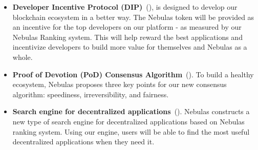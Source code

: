 {\begin{itemize}
	\item \textbf{Developer Incentive Protocol (DIP)}~(), is designed to develop our blockchain ecosystem in a better way. The Nebulas token will be provided as an incentive for the top developers on our platform - as measured by our Nebulas Ranking system. This will help reward the best applications and incentivize developers to build more value for themselves and Nebulas as a whole.

  \item \textbf{Proof of Devotion (PoD) Consensus Algorithm}~(). To build a healthy ecosystem, Nebulas proposes three key points for our new consensus algorithm: speediness, irreversibility,  and fairness. 

  \item \textbf{Search engine for decentralized applications}~(). Nebulas constructs a new type of search engine for decentralized applications based on Nebulas ranking system. Using our engine, users will be able to find the most useful decentralized applications when they need it. 

\end{itemize}
}

